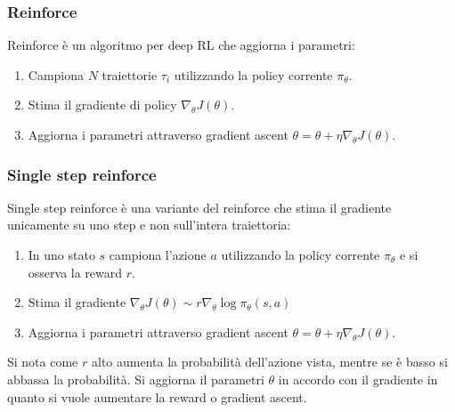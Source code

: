 \subsubsection{Reinforce}
Reinforce \`e un algoritmo per deep RL che aggiorna i parametri:
\begin{enumerate}
	\item Campiona $N$ traiettorie $\tau_i$ utilizzando la policy corrente $\pi_\theta$.
	\item Stima il gradiente di policy $\nabla_\theta J(\theta)$.
	\item Aggiorna i parametri attraverso gradient ascent $\theta = \theta + \eta\nabla_\theta J(\theta)$.
\end{enumerate}

\subsubsection{Single step reinforce}
Single step reinforce \`e una variante del reinforce che stima il gradiente unicamente su uno step e non sull'intera traiettoria:
\begin{enumerate}
	\item In uno stato $s$ campiona l'azione $a$ utilizzando la policy corrente $\pi_\theta$ e si osserva la reward $r$.
	\item Stima il gradiente $\nabla_\theta J(\theta)\sim r\nabla_\theta\log\pi_\theta(s,a)$
	\item Aggiorna i parametri attraverso gradient ascent $\theta = \theta + \eta\nabla_\theta J(\theta)$.
\end{enumerate}
Si nota come $r$ alto aumenta la probabilit\`a dell'azione vista, mentre se \`e basso si abbassa la probabilit\`a.
Si aggiorna il parametri $\theta$ in accordo con il gradiente in quanto si vuole aumentare la reward o gradient ascent.
